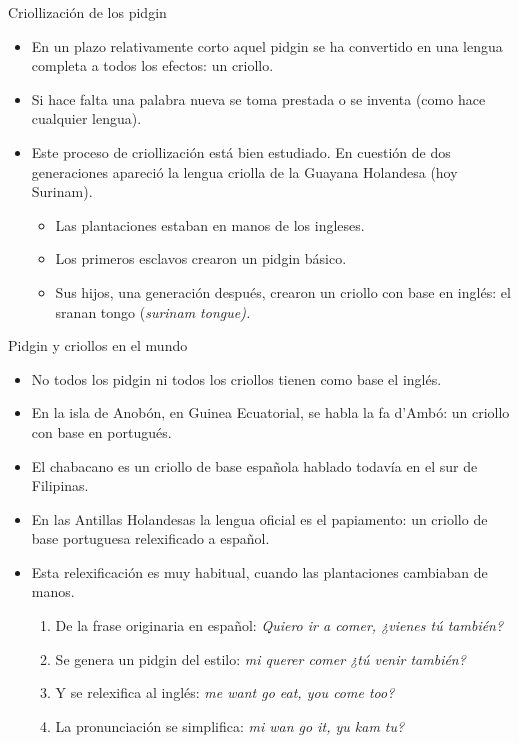 \documentclass[handout]{beamer}
\begin{document}
\begin{frame}{Criollización de los pidgin}

\begin{itemize}
	\item En un plazo relativamente corto aquel pidgin se ha convertido en una lengua completa a todos los efectos: un criollo.
	\item Si hace falta una palabra nueva se toma prestada o se inventa (como hace cualquier lengua).
	\item Este proceso de criollización está bien estudiado. En cuestión de dos generaciones apareció la lengua criolla de la Guayana Holandesa (hoy Surinam). 
	\begin{itemize}
		\item Las plantaciones estaban en manos de los ingleses. 
		\item Los primeros esclavos crearon un pidgin básico. 
		\item Sus hijos, una generación después, crearon un criollo con base en inglés: el sranan tongo (\it{surinam tongue}).
	\end{itemize}
\end{itemize}
\end{frame}

\begin{frame}{Pidgin y criollos en el mundo}

\begin{itemize}
	\item No todos los pidgin ni todos los criollos tienen como base el inglés. 
	\item En la isla de Anobón, en Guinea Ecuatorial, se habla la fa d'Ambó: un criollo con base en portugués.
	\item El chabacano es un criollo de base española hablado todavía en el sur de Filipinas.
	\item En las Antillas Holandesas la lengua oficial es el papiamento: un criollo de base portuguesa relexificado a español.
	\item Esta relexificación es muy habitual, cuando las plantaciones cambiaban de manos.
	\begin{enumerate}
		\item De la frase originaria en español: \it{Quiero ir a comer, ¿vienes tú también?}
		\item Se genera un pidgin del estilo: \it{mi querer comer ¿tú venir también?}
		\item Y se relexifica al inglés: \it{me want go eat, you come too?}
		\item La pronunciación se simplifica: \it{mi wan go it, yu kam tu?}
	\end{enumerate}
\end{itemize}
\end{frame}
\end{document}
